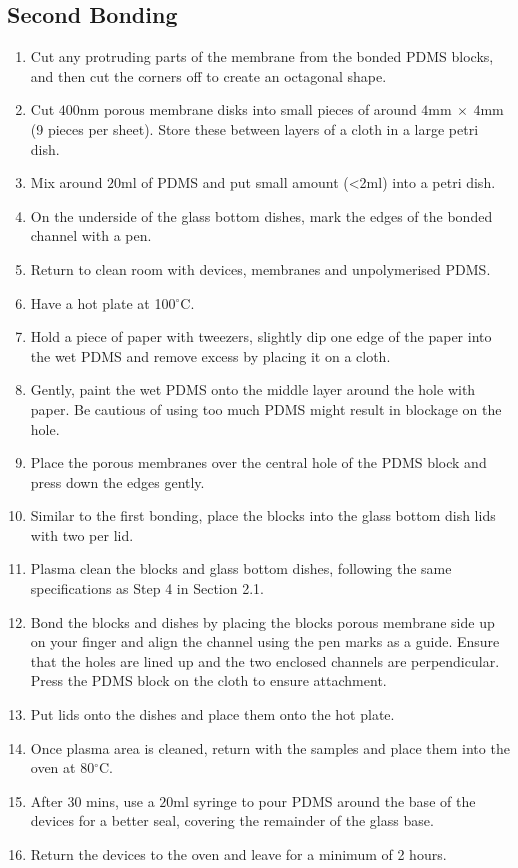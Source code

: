\subsection*{Second Bonding}

\begin{enumerate}
 \setlength\itemsep{-0.1em}
	\item Cut any protruding parts of the membrane from the bonded PDMS blocks, and then cut the corners off to create an octagonal shape.
	\item Cut $400  \text{nm}$ porous membrane disks into small pieces of around $4  \text{mm} \: \times \: 4  \text{mm}$ (9 pieces per sheet). Store these between layers of a cloth in a large petri dish.
	\item Mix around $20  \text{ml}$ of PDMS and put small amount (<2ml) into a petri dish.
	\item On the underside of the glass bottom dishes, mark the edges of the bonded channel with a pen.
	\item Return to clean room with devices, membranes and unpolymerised PDMS.
	\item Have a hot plate at 100$^{\circ}$C.
	\item Hold a piece of paper with tweezers, slightly dip one edge of the paper into the wet PDMS and remove excess by placing it on a cloth. 
	\item Gently, paint the wet PDMS onto the middle layer around the hole with paper. Be cautious of using too much PDMS might result in blockage on the hole.
	\item Place the porous membranes over the central hole of the PDMS block and press down the edges gently. 
	\item Similar to the first bonding, place the blocks into the glass bottom dish lids with two per lid. 
	\item Plasma clean the blocks and glass bottom dishes, following the same specifications as Step 4 in Section 2.1.
	\item Bond the blocks and dishes by placing the blocks porous membrane side up on your finger and align the channel using the pen marks as a guide. Ensure that the holes are lined up and the two enclosed channels are perpendicular. Press the PDMS block on the cloth to ensure attachment. 
	\item Put lids onto the dishes and place them onto the hot plate.
	\item Once plasma area is cleaned, return with the samples and place them into the oven at 80$^{\circ}$C. 
	\item After 30 mins, use a $20  \text{ml}$ syringe to pour PDMS around the base of the devices for a better seal, covering the remainder of the glass base.
	\item Return the devices to the oven and leave for a minimum of 2 hours.
\end{enumerate}

